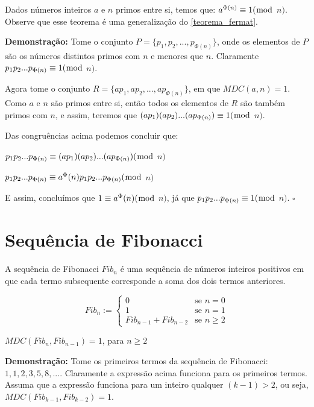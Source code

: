\begin{theorem}\label{teorema_de_euler}
Dados números inteiros $a$ e $n$ primos entre si, temos que:
$a^{\Phi(n)} \equiv 1 (\bmod$ $n)$. Observe que esse teorema é uma generalização do \autoref{teorema_fermat}.
\end{theorem}
\textbf{Demonstração:}
Tome o conjunto $P = \{p_1, p_2, ..., p_{\Phi(n)}\}$, onde os elementos de $P$ são os números distintos primos com $n$ e menores que $n$. Claramente $p_1p_2...p_{\Phi(n)} \equiv 1(\bmod$ $n)$.

Agora tome o conjunto $R = \{ap_1, ap_2, ..., ap_{\Phi(n)}\}$, em que $MDC(a,n) = 1$. Como $a$ e $n$ são primos entre si, então todos
os elementos de $R$ são também primos com $n$, e assim, teremos que $(ap_1)(ap_2)...(ap_{\Phi(n)}) \equiv 1(\bmod$ $n)$.

Das congruências acima podemos concluir que:
\newline

$p_1p_2...p_{\Phi(n)} \equiv  (ap_1)(ap_2)...(ap_{\Phi(n)}) (\bmod$ $n)$ 

$p_1p_2...p_{\Phi(n)} \equiv a^\Phi(n)p_1p_2...p_{\Phi(n)} (\bmod$ $n)$
\newline

E assim, concluímos que $1 \equiv a^\Phi(n)(\bmod$ $n)$, já que $p_1p_2...p_{\Phi(n)} \equiv 1(\bmod$ $n)$. $\square$
\\

\section{Sequência de Fibonacci}

\begin{definition}
A sequência de Fibonacci $Fib_n$ é uma sequência de números inteiros positivos em que cada termo subsequente corresponde a soma dos dois termos anteriores.

\[
 Fib_n :=
  \begin{cases}
   0 & \text{se } n = 0 \\
   1 & \text{se } n = 1 \\
   Fib_{n-1} + Fib_{n-2} & \text{se } n \geq 2
  \end{cases}
\]
\end{definition}


\begin{proposition}\label{gcd_consecutivo_fib}
$MDC(Fib_n, Fib_{n-1}) = 1$, para $n \geq 2$
\end{proposition}
\textbf{Demonstração:}
Tome os primeiros termos da sequência de Fibonacci: $1, 1, 2, 3, 5, 8,...$.
Claramente a expressão acima funciona para os primeiros termos.
Assuma que a expressão funciona para um inteiro qualquer $(k-1) > 2$, ou seja, $MDC(Fib_{k-1}, Fib_{k-2}) = 1$.

